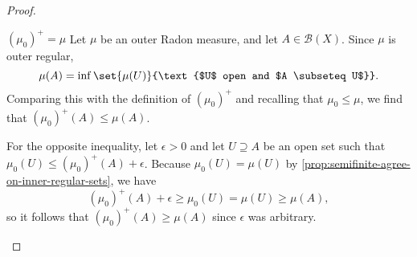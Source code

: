 \documentclass[article, a4paper, 11pt, oneside]{memoir}
\numberwithin{equation}{chapter}
\newcommand{\calB}{\mathcal{B}}
\newcommand{\borel}[1]{\calB(#1)}
\begin{document}
\begin{proof}
\begin{proofsec}


    \item[$(\mu_0)^+ = \mu$]
    Let $\mu$ be an outer Radon measure, and let $A \in \borel{X}$. Since $\mu$ is outer regular,
    \begin{equation*}
        \mu(A)
            = \inf \set{\mu(U)}{\text{$U$ open and $A \subseteq U$}}.
    \end{equation*}
    Comparing this with the definition of $(\mu_0)^+$ and recalling that $\mu_0 \leq \mu$, we find that $(\mu_0)^+(A) \leq \mu(A)$.

    For the opposite inequality, let $\epsilon > 0$ and let $U \supseteq A$ be an open set such that $\mu_0(U) \leq (\mu_0)^+(A) + \epsilon$. Because $\mu_0(U) = \mu(U)$ by \cref{prop:semifinite-agree-on-inner-regular-sets}, we have
    \begin{equation*}
        (\mu_0)^+(A) + \epsilon
            \geq \mu_0(U)
            = \mu(U)
            \geq \mu(A),
    \end{equation*}
    so it follows that $(\mu_0)^+(A) \geq \mu(A)$ since $\epsilon$ was arbitrary.


\end{proofsec}
\end{proof}
\end{document}

